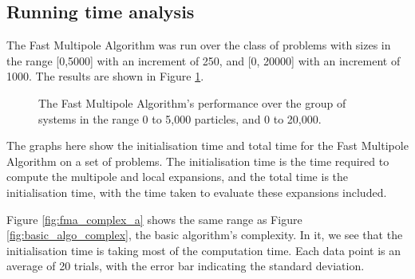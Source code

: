 \documentclass[pdftex,twoside,a4paper]{report}
\newcommand{\fma}{Fast Multipole Algorithm}
\begin{document}
\subsection{Running time analysis}
The \fma{} was run over the class of problems with sizes in the range [0,5000] with an increment of 250, and [0, 20000] with an increment of 1000. The results are shown in Figure \ref{fig:fma_complex}.
\begin{figure}[H]
\caption{The \fma's performance over the group of systems in the range 0 to 5,000 particles, and 0 to 20,000.}
\label{fig:fma_complex}
\end{figure}

The graphs here show the initialisation time and total time for the \fma{} on a set of problems. The initialisation time is the time required to compute the multipole and local expansions, and the total time is the initialisation time, with the time taken to evaluate these expansions included.

Figure \ref{fig:fma_complex_a} shows the same range as Figure \ref{fig:basic_algo_complex}, the basic algorithm's complexity. In it, we see that the initialisation time is taking most of the computation time. Each data point is an average of 20 trials, with the error bar indicating the standard deviation.
\end{document}
